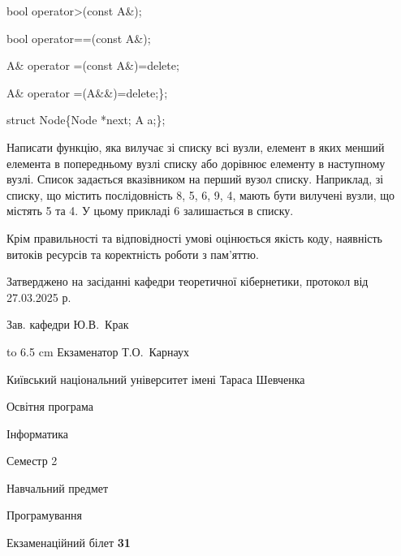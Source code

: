 \documentclass[12pt, ukrainian]{article}
\begin{document}
{\quad  bool operator>(const A\&); 

\quad  bool operator==(const A\&); 

\quad A\& operator =(const A\&)=delete; 

\quad  A\& operator =(A\&\&)=delete;\};

struct Node\{Node *next; A a;\};

 Написати функцію, яка вилучає зі списку всі вузли, елемент в яких менший елемента в попередньому вузлі списку або дорівнює елементу в наступному вузлі. Список задається вказівником на перший вузол списку. Наприклад, зі списку, що містить послідовність 8, 5, 6, 9, 4, мають бути вилучені вузли, що містять 5 та 4. У цьому прикладі 6 залишається в списку.

Крім правильності та відповідності умові оцінюється якість коду, наявність витоків ресурсів та коректність роботи з пам'яттю. 

}
{\smallskip\smallskip \begin {scriptsize} Затверджено на засіданні кафедри теоретичної кібернетики, протокол   від   27.03.2025 р.\par\smallskip\smallskip\smallskip\smallskip
{\parbox {6.5 cm} {Зав. кафедри \dotfill Ю.В.~Крак}}\hspace {0.7cm} {\hbox to 6.5 cm { Екзаменатор \dotfill Т.О.~Карнаух}} \end{scriptsize}}
\newpage
{{\begin {scriptsize}\par
{ \center  Київський національний університет імені Тараса Шевченка \par}
{\parbox {5 cm}{Освітня програма \hfill}{\parbox {7 cm}{Інформатика\hfill}}\parbox {6 cm}{\hfill Семестр 2}}\par
{\parbox {5 cm} {Навчальний предмет \hfill}\parbox {7 cm}{Програмування \hfill}\parbox {6cm}{\hfill}\par}\vspace{-15pt} \end{scriptsize}}{\center Екзаменаційний білет \No \textbf { 31 }\par}}
\end{document}
